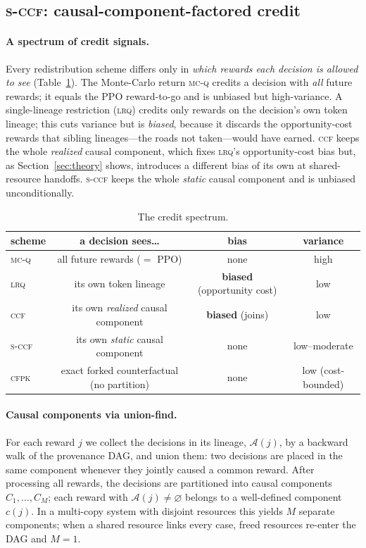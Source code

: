 \documentclass[review,authoryear,3p,times]{elsarticle}
\newcommand{\ccf}{\textsc{ccf}}
\newcommand{\sccf}{\textsc{s-ccf}}
\newcommand{\mcq}{\textsc{mc-q}}
\newcommand{\lrq}{\textsc{lrq}}
\newcommand{\cfpk}{\textsc{cfpk}}
\newcommand{\Ascr}{\mathcal{A}}
\begin{document}
\subsection{\sccf: causal-component-factored credit}
\label{sec:method:sccf}

\paragraph{A spectrum of credit signals.} Every redistribution scheme differs
only in \emph{which rewards each decision is allowed to see} (Table~\ref{tab:spectrum}).
The Monte-Carlo return \mcq{} credits a decision with \emph{all} future rewards;
it equals the PPO reward-to-go and is unbiased but high-variance. A
single-lineage restriction (\lrq) credits only rewards on the decision's own
token lineage; this cuts variance but is \emph{biased}, because it discards the
opportunity-cost rewards that sibling lineages---the roads not taken---would have
earned. \ccf{} keeps the whole \emph{realized} causal component, which fixes
\lrq's opportunity-cost bias but, as Section~\ref{sec:theory} shows, introduces a
different bias of its own at shared-resource handoffs. \sccf{} keeps the whole
\emph{static} causal component and is unbiased unconditionally.

\begin{table}[t]
\centering
\caption{The credit spectrum.}
\label{tab:spectrum}
\begin{tabular}{lccc}
\toprule
scheme & a decision sees\dots & bias & variance \\
\midrule
\mcq{} & all future rewards ($=$ PPO) & none & high \\
\lrq{} & its own token lineage & \textbf{biased} (opportunity cost) & low \\
\ccf{} & its own \emph{realized} causal component & \textbf{biased} (joins) & low \\
\sccf{} & its own \emph{static} causal component & none & low--moderate \\
\cfpk{} & exact forked counterfactual (no partition) & none & low (cost-bounded) \\
\bottomrule
\end{tabular}
\end{table}

\paragraph{Causal components via union-find.} For each reward $j$ we collect the
decisions in its lineage, $\Ascr(j)$, by a backward walk of the provenance DAG,
and union them: two decisions are placed in the same component whenever they
jointly caused a common reward. After processing all rewards, the decisions are
partitioned into causal components $C_1,\dots,C_M$; each reward with
$\Ascr(j)\neq\varnothing$ belongs to a well-defined component $c(j)$. In a
multi-copy system with disjoint resources this yields $M$ separate components;
when a shared resource links every case, freed resources re-enter the DAG and
$M=1$.
\end{document}
